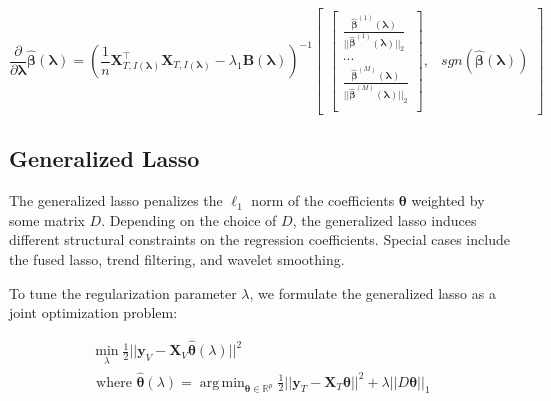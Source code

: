 \documentclass[10pt,letterpaper]{article}
\DeclareMathOperator*{\argmin}{arg\,min}
\begin{document}
\begin{equation}
\frac{\partial}{\partial \boldsymbol\lambda} \hat{\boldsymbol{\beta}}(\boldsymbol{\lambda}) =
\left (
\frac{1}{n} \boldsymbol{X}_{T, I(\boldsymbol\lambda)}^\top \boldsymbol{X}_{T, I(\boldsymbol\lambda)}
- \lambda_1 \boldsymbol{B}(\boldsymbol\lambda)
\right ) ^{-1}
\begin{bmatrix}
\begin{bmatrix}
\frac{\hat{\boldsymbol{\beta}}^{(1)}(\boldsymbol \lambda)}{||\hat{\boldsymbol{\beta}}^{(1)} (\boldsymbol \lambda)||_2}\\
...\\
\frac{\hat{\boldsymbol \beta}^{(M)} (\boldsymbol \lambda)}{||\hat{\boldsymbol{\beta}}^{(M)}(\boldsymbol \lambda)||_2}\\
\end{bmatrix},
&
sgn(\hat{\boldsymbol{\beta}}(\boldsymbol{\lambda}))
\end{bmatrix}
\end{equation}


\subsection{Generalized Lasso}
The generalized lasso \citep{roth2004generalized} penalizes the $\ell_1$ norm of the coefficients $\boldsymbol \theta$ weighted by some matrix $D$. Depending on the choice of $D$, the generalized lasso induces different structural constraints on the regression coefficients. Special cases include the fused lasso, trend filtering, and wavelet smoothing.

To tune the regularization parameter $\lambda$, we formulate the generalized lasso as a joint optimization problem:

\begin{equation}
\begin{array}{c}
\min_{\lambda} \frac{1}{2} \lvert\lvert \boldsymbol{y}_V - \boldsymbol{X}_V \hat{\boldsymbol{\theta}} (\lambda) \rvert\rvert ^2 \\
\text{ where }
\hat{\boldsymbol{\theta}} (\lambda) =
\argmin_{\boldsymbol{\theta} \in \mathbb{R}^p}
\frac{1}{2} \lvert\lvert \boldsymbol{y}_T - \boldsymbol{X}_T \boldsymbol{\theta} \rvert\rvert ^2
+ \lambda \lvert\lvert D \boldsymbol{\theta} \rvert \rvert_1
\end{array}
\label{genlasso}
\end{equation}
\end{document}
